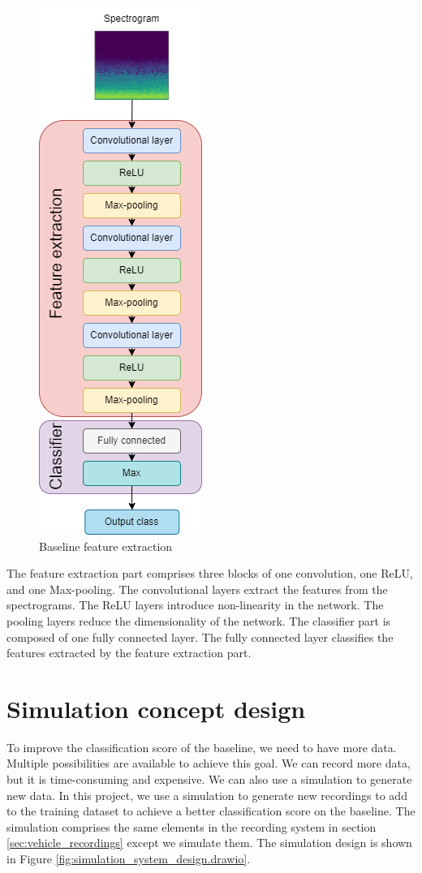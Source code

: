 \begin{figure}[H]
    \centering
    \includegraphics[width=.25\textwidth]{../Images/cnn_architecture_design.drawio.png}
    \caption{Baseline feature extraction}
    \label{fig:baseline_feature_extraction}
\end{figure}

The feature extraction part comprises three blocks of one convolution, one ReLU, and one Max-pooling. The convolutional layers extract the features from the spectrograms. The ReLU layers introduce non-linearity in the network. The pooling layers reduce the dimensionality of the network. The classifier part is composed of one fully connected layer. The fully connected layer classifies the features extracted by the feature extraction part. 

\section{Simulation concept design}

To improve the classification score of the baseline, we need to have more data. Multiple possibilities are available to achieve this goal. We can record more data, but it is time-consuming and expensive. We can also use a simulation to generate new data. In this project, we use a simulation to generate new recordings to add to the training dataset to achieve a better classification score on the baseline. The simulation comprises the same elements in the recording system in section \ref{sec:vehicle_recordings} except we simulate them. The simulation design is shown in Figure \ref{fig:simulation_system_design.drawio}.

